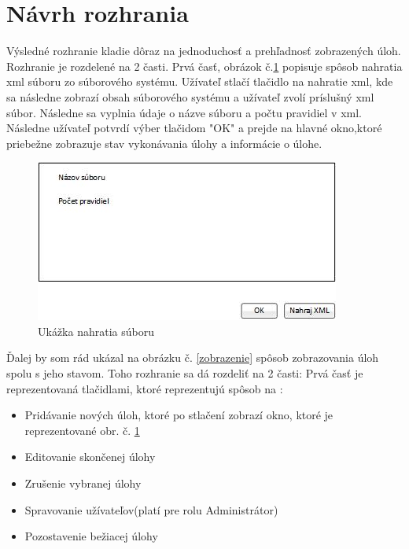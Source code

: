 \section{Návrh rozhrania}
Výsledné rozhranie kladie dôraz na jednoduchosť a prehľadnosť zobrazených úloh. Rozhranie je rozdelené na 2 časti. Prvá časť, obrázok č.\ref{nahratie} popisuje spôsob nahratia xml súboru zo súborového systému. Užívateľ stlačí tlačidlo na nahratie xml, kde sa následne zobrazí obsah súborového systému a užívateľ zvolí príslušný xml súbor. Následne sa vyplnia údaje o názve súboru a počtu pravidiel v xml. Následne užívateľ potvrdí výber tlačidom "OK" a prejde na hlavné okno,ktoré priebežne zobrazuje stav vykonávania úlohy a informácie o úlohe.
\begin{figure}[!htb]

\begin{center}

\includegraphics[scale=0.8]{NahratieSuboru.jpg} 
\caption{Ukážka nahratia súboru}
\label{nahratie}

\end{center}

\end{figure}

Ďalej by som rád ukázal na obrázku č. \ref{zobrazenie} spôsob zobrazovania úloh spolu s jeho stavom. Toho rozhranie sa dá rozdeliť na 2 časti: Prvá časť je reprezentovaná tlačidlami, ktoré reprezentujú spôsob na : 
\begin{itemize}
\item Pridávanie nových úloh, ktoré po stlačení zobrazí okno, ktoré je reprezentované obr. č. \ref{nahratie}
\item Editovanie skončenej úlohy
\item Zrušenie vybranej úlohy
\item Spravovanie užívateľov(platí pre rolu Administrátor)
\item Pozostavenie bežiacej úlohy

\end{itemize}

